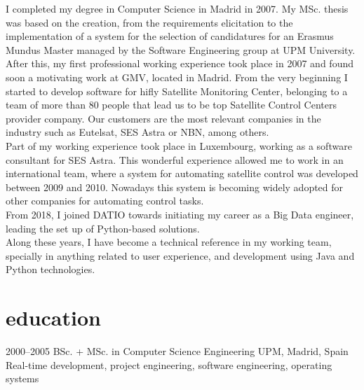 \documentclass[]{friggeri-cv}
\begin{document}
{\headingfont I completed my degree} in Computer Science in Madrid in 2007. My MSc. thesis was based on 
the creation, from the requirements elicitation to the implementation of a system for the selection of candidatures for an
Erasmus Mundus Master managed by the Software Engineering group at UPM University. \\
{\headingfont After this, my first professional working experience} took place in 2007 and found soon a motivating work 
at GMV, located in Madrid. From the very beginning I started to develop software for hifly Satellite Monitoring Center,
belonging to a team of more than 80 people that lead us to be top Satellite Control Centers provider company. 
Our customers are the most relevant companies in the industry such as Eutelsat, SES Astra or NBN, among others. \\
{\headingfont Part of my working experience took place in Luxembourg,} working as a software consultant for SES Astra.
This wonderful experience allowed me to work in an international team, where a system for automating satellite control
was developed between 2009 and 2010. Nowadays this system is becoming widely adopted for other companies for automating
control tasks. \\
{\headingfont From 2018, I joined DATIO towards initiating my career as a Big Data engineer}, leading the set up of Python-based
solutions. \\
{\headingfont Along these years,} I have become a technical reference in my working team, specially in anything related
to user experience, and development using Java and Python technologies. \\


\section{education}

\begin{entrylist}
\entry
{2000--2005}
{BSc. + MSc. {\normalfont in Computer Science Engineering}}
{UPM, Madrid, Spain}
{Real-time development, project engineering, software engineering, operating systems}
\end{entrylist}
\end{document}
